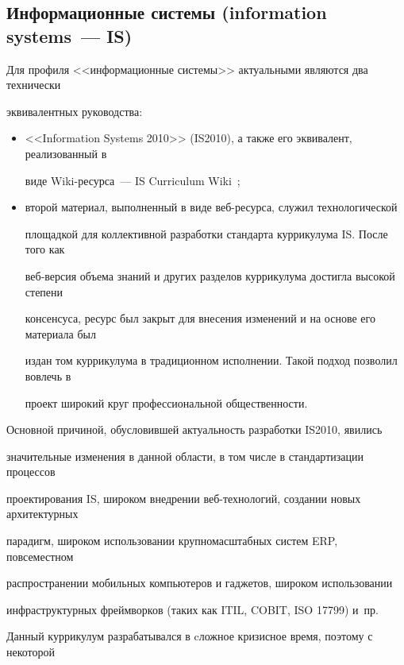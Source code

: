 \subsection{Информационные системы (information systems~--- IS)}

   

   Для профиля <<информационные системы>> актуальными являются два технически 

эквивалентных руководства:

   \begin{itemize}

\item <<Information Systems 2010>> (IS2010), а также его эквивалент, реализованный в 

виде Wiki-ресурса~--- IS Curriculum Wiki~\cite{18-s};

\item второй материал, выполненный в виде веб-ресурса, служил технологической 

площадкой для коллективной разработки стандарта куррикулума IS. После того как 

веб-версия объема знаний и других разделов куррикулума достигла высокой степени 

консенсуса, ресурс был закрыт для внесения изменений и на основе его материала был 

издан том куррикулума в традиционном исполнении. Такой подход позволил вовлечь в 

проект широкий круг профессиональной общественности.

\end{itemize}



Основной причиной, обусловившей актуальность разработки IS2010, явились 

значительные изменения в данной области, в том числе в стандартизации процессов 

проектирования IS, широком внедрении веб-технологий, создании новых архитектурных 

парадигм, широком использовании крупномасштабных систем ERP, повсеместном 

распространении мобильных компьютеров и гаджетов, широком использовании 

инфраструктурных фреймворков (таких как ITIL, COBIT, ISO 17799) и~пр. 



Данный куррикулум разрабатывался в cложное кризисное время, поэтому с некоторой 

